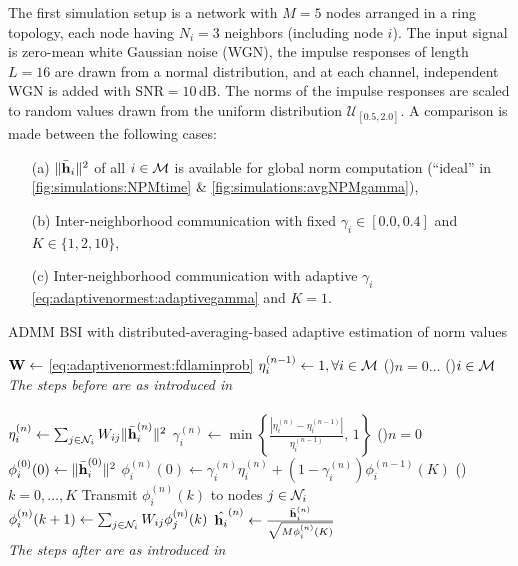 \documentclass{article}
\begin{document}
The first simulation setup is a network with \(M=5\) nodes arranged in a ring topology, each node having \(N_i=3\) neighbors (including node \(i\)).
The input signal is zero-mean white Gaussian noise (WGN), the impulse responses of length \(L=16\) are drawn from a normal distribution, and at each channel, independent WGN is added with \(\text{SNR}=10\,\text{dB}\).
The norms of the impulse responses are scaled to random values drawn from the uniform distribution \(\mathcal{U}_{[0.5,2.0]}\).
A comparison is made between the following cases:
\begin{itemize}
    \itemsep-0.2em
    \item[(a)] \(\|\bar{\bm{\mathrm{h}}}_i\|^2\) of all \(i \in \mathcal{M}\) is available for global norm computation (``ideal'' in \autoref{fig:simulations:NPMtime} \& \autoref{fig:simulations:avgNPMgamma}),
    \item[(b)] Inter-neighborhood communication with fixed \(\gamma_i \in [0.0, 0.4]\) and \(K \in \{1,2,10\}\),
    \item[(c)] Inter-neighborhood communication with adaptive \(\gamma_i\) \eqref{eq:adaptivenormest:adaptivegamma} and \(K=1\).
\end{itemize}
\begin{algorithm}[t]
    \caption{ADMM BSI with distributed-averaging-based adaptive estimation of norm values}\label{alg:davg_norm_est}
    \(\bm{\mathrm{W}} \gets\) \eqref{eq:adaptivenormest:fdlaminprob}\;
    \(\eta_i^{(n-1)} \gets 1, \forall i \in \mathcal{M}\)\;
    \For(){\(n=0\dots\)}
    {
        \For(){\(i \in \mathcal{M}\)}
        {
            \emph{The steps before are as introduced in }\cite{blochbergerDBSI}\\
            \dotfill\\
            \(\eta_i^{(n)} \gets \sum_{j \in \mathcal{N}_i} W_{ij} \|\bar{\bm{\mathrm{h}}}_i^{(n)}\|^2\)\;
            \(\gamma_i^{(n)} \gets \min \left\lbrace \frac{| \eta_i^{(n)} - \eta_i^{(n-1)} |}{\eta_i^{(n-1)}},\,1\right\rbrace\)\;
            \eIf(){\(n = 0\)}
            {
                \(\phi_i^{(0)}(0) \gets \|\bar{\bm{\mathrm{h}}}_i^{(0)}\|^2\)\;
            }
            {
                \(\phi_i^{(n)}(0) \gets \gamma_i^{(n)} \eta_i^{(n)} + (1-\gamma_i^{(n)}) \phi_i^{(n-1)}(K)\)\;
            }
            \For(){\(k=0,\dots,K\)}
            {
                Transmit \(\phi_i^{(n)}(k)\) to nodes  \(j \in \mathcal{N}_i\)\;
                \(\phi_i^{(n)}({k+1}) \gets \sum_{j \in \mathcal{N}_i} W_{ij} \phi_j^{(n)}({k})\)\;
            }
            \(\hat{\bm{\mathrm{h}}_i}^{(n)} \gets \frac{\bar{\bm{\mathrm{h}}}_i^{(n)}}{\sqrt{M \phi_i^{(n)}(K)}}\)\;
            \dotfill\\
            \emph{The steps after are as introduced in }\cite{blochbergerDBSI}\\
        }
    }
\end{algorithm}
\end{document}
